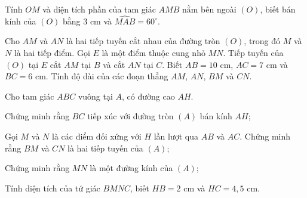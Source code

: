 \begin{practice}
\begin{questions}[resume=SBT]
\begin{questions}
            \item Tính $OM$ và diện tích phần của tam giác $AMB$ nằm bên ngoài $(O)$, biết bán kính của $(O)$ bằng 3 cm và $\widehat{MAB}=60^\circ$.

            \answerline
            \answerline
            \answerline
        \end{questions}

        \item Cho $AM$ và $AN$ là hai tiếp tuyến cắt nhau của đường tròn $(O)$, trong đó $M$ và $N$ là hai tiếp điểm. Gọi $E$ là một điểm thuộc cung nhỏ $MN$. Tiếp tuyến của $(O)$ tại $E$ cắt $AM$ tại $B$ và cắt $AN$ tại $C$. Biết $AB=10$ cm, $AC=7$ cm và $BC=6$ cm. Tính độ dài của các đoạn thẳng $AM$, $AN$, $BM$ và $CN$.

        \answerline
        \answerline
        \answerline

        \item Cho tam giác $ABC$ vuông tại $A$, có đường cao $AH$.
        \begin{questions}
            \item Chứng minh rằng $BC$ tiếp xúc với đường tròn $(A)$ bán kính $AH$;

            \answerline
            \answerline

            \item Gọi $M$ và $N$ là các điểm đối xứng với $H$ lần lượt qua $AB$ và $AC$. Chứng minh rằng $BM$ và $CN$ là hai tiếp tuyến của $(A)$;

            \answerline
            \answerline
            \answerline

            \item Chứng minh rằng $MN$ là một đường kính của $(A)$;

            \answerline
            \answerline

            \item Tính diện tích của tứ giác $BMNC$, biết $HB=2$ cm và $HC=4{,}5$ cm.

            \answerline
            \answerline
            \answerline
        \end{questions}
    \end{questions}
\end{practice}
